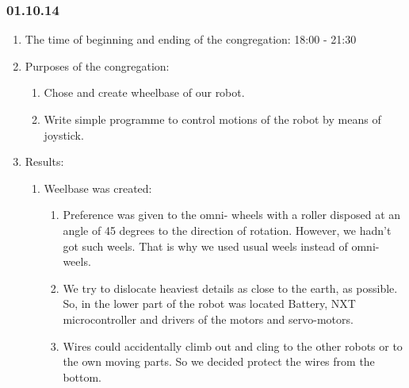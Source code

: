
\subsubsection{01.10.14}

\begin{enumerate}
	\item The time of beginning and ending of the congregation:
	18:00 - 21:30
	\item Purposes of the congregation:
	\begin{enumerate}
		\item Chose and create wheelbase of our robot.
		
		\item Write simple programme to control motions of the robot by means of joystick.
		
	\end{enumerate}
	
	\item Results:
	\begin{enumerate}
		\item Weelbase was created:
		\begin{enumerate}
			\item Preference was given to the omni- wheels with a roller disposed at an angle of 45 degrees to the direction of rotation. However, we hadn't got such weels. That is why we used usual weels instead of omni-weels.
			
			\item We try to dislocate heaviest details as close to the earth, as possible. So,  in the lower part of the robot was located Battery, NXT microcontroller and drivers of the motors and servo-motors. 
			
			\item Wires could accidentally climb out and cling to the other robots or to the own moving parts. So we decided protect the wires from the bottom.
			

\end{enumerate}
\end{enumerate}
\end{enumerate}
